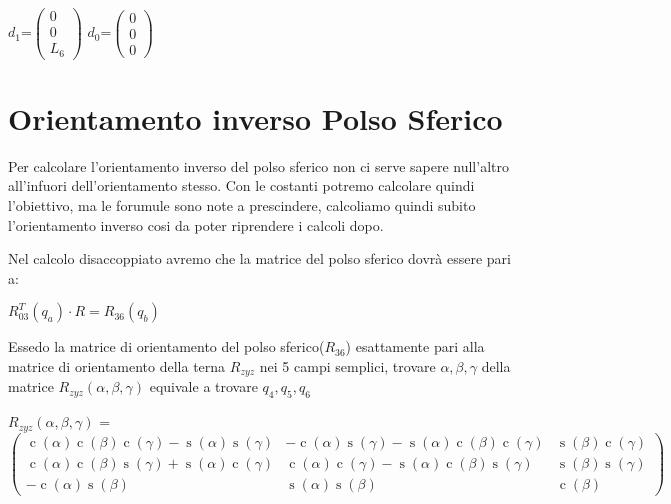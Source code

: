 \documentclass[a4paper,12pt]{article}
\begin{document}
\begin{center}
$ d_1 $=$\begin{pmatrix}
0\\
0\\
L_6\end{pmatrix}$
\space
$ d_0 $=$\begin{pmatrix}
0\\
0\\
0\end{pmatrix}$
\end{center}

\section{Orientamento inverso Polso Sferico}
Per calcolare l'orientamento inverso del polso sferico non ci serve sapere null'altro all'infuori dell'orientamento stesso.
Con le costanti potremo calcolare quindi l'obiettivo, ma le forumule sono note a prescindere, calcoliamo quindi subito l'orientamento inverso cosi  da poter riprendere i calcoli dopo.


Nel calcolo disaccoppiato avremo che la matrice del polso sferico dovrà essere pari a:

\begin{center}
$ R_{03}^T(q_a) \cdot R = R_{36}(q_b) $
 \end{center}


Essedo la matrice di orientamento del polso sferico($R_{36}$) esattamente
pari alla matrice di orientamento della terna $ R_{zyz} $ nei 5 campi semplici,
trovare $ \alpha,\beta,\gamma $ della matrice $ R_{zyz}(\alpha,\beta,\gamma) $ equivale a trovare $q_4,q_5,q_6$ 

\begin{center}
$ R_{zyz}(\alpha,\beta,\gamma)$ = $\begin{pmatrix}\operatorname{c}\left( \alpha \right)  \operatorname{c}\left( \beta \right)  \operatorname{c}\left( \gamma \right) -\operatorname{s}\left( \alpha \right)  \operatorname{s}\left( \gamma \right)  & -\operatorname{c}\left( \alpha \right)  \operatorname{s}\left( \gamma \right) -\operatorname{s}\left( \alpha \right)  \operatorname{c}\left( \beta \right)  \operatorname{c}\left( \gamma \right)  & \operatorname{s}\left( \beta \right)  \operatorname{c}\left( \gamma \right) \\
\operatorname{c}\left( \alpha \right)  \operatorname{c}\left( \beta \right)  \operatorname{s}\left( \gamma \right) +\operatorname{s}\left( \alpha \right)  \operatorname{c}\left( \gamma \right)  & \operatorname{c}\left( \alpha \right)  \operatorname{c}\left( \gamma \right) -\operatorname{s}\left( \alpha \right)  \operatorname{c}\left( \beta \right)  \operatorname{s}\left( \gamma \right)  & \operatorname{s}\left( \beta \right)  \operatorname{s}\left( \gamma \right) \\
-\operatorname{c}\left( \alpha \right)  \operatorname{s}\left( \beta \right)  & \operatorname{s}\left( \alpha \right)  \operatorname{s}\left( \beta \right)  & \operatorname{c}\left( \beta \right) \end{pmatrix}$
\end{center}
\end{document}

